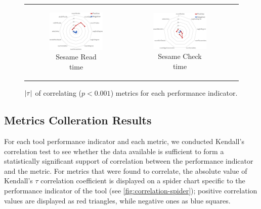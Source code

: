 \begin{figure}[tp]
\begin{center}
\begin{tabular}{c c c}
\begin{subfigure}[t]{0.31\textwidth}
	    \includegraphics[width=0.95\textwidth]{figures/spider-sesame-read.pdf}
	    \caption{Sesame Read time}\end{subfigure} &
	    \begin{subfigure}[t]{0.31\textwidth}\centering
	    \includegraphics[width=0.95\textwidth]{figures/spider-sesame-check.pdf}
	    \caption{Sesame Check time}\end{subfigure} 
    \end{tabular}

  \caption{$|{\tau}|$ of correlating ($p<0.001$) metrics for each performance indicator.}
  \label{fig:correlation-spider}
\end{center}
\end{figure}

\subsection{Metrics Colleration Results}
For each tool performance indicator and each metric, we conducted Kendall's correlation test to see whether the data available is sufficient to form a statistically significant support of correlation between the performance indicator and the metric. For metrics that were found to correlate, the absolute value of Kendall's $\tau$ correlation coefficient is displayed on a spider chart specific to the performance indicator of the tool (see \autoref{fig:correlation-spider}); positive correlation values are displayed as red triangles, while negative ones as blue squares.  

